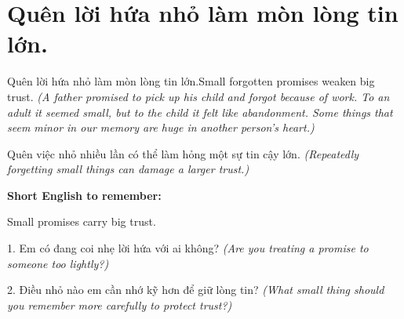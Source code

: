 \section{Quên lời hứa nhỏ làm mòn lòng tin lớn.}
\begin{truyen}{Quên lời hứa nhỏ làm mòn lòng tin lớn.}{Small forgotten promises weaken big trust.}
\textit{(A father promised to pick up his child and forgot because of work. To an adult it seemed small, but to the child it felt like abandonment. Some things that seem minor in our memory are huge in another person's heart.)}
\end{truyen}
\begin{baihoc}
Quên việc nhỏ nhiều lần có thể làm hỏng một sự tin cậy lớn.
\textit{(Repeatedly forgetting small things can damage a larger trust.)}
\end{baihoc}
\begin{ghinhoanh}
\textbf{Short English to remember:}

Small promises carry big trust.
\end{ghinhoanh}
\begin{tuhocnhanh}
1. Em có đang coi nhẹ lời hứa với ai không? \textit{(Are you treating a promise to someone too lightly?)}

2. Điều nhỏ nào em cần nhớ kỹ hơn để giữ lòng tin? \textit{(What small thing should you remember more carefully to protect trust?)}
\end{tuhocnhanh}
\ngancach

